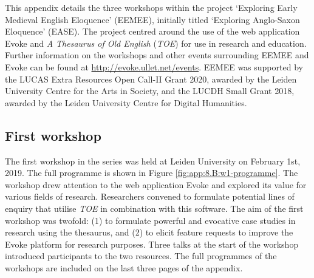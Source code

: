 This appendix details the three workshops within the project `Exploring Early Medieval English Eloquence' (EEMEE), initially titled `Exploring Anglo-Saxon Eloquence' (EASE). The project centred around the use of the web application Evoke and \textit{A Thesaurus of Old English} (\textit{TOE}) for use in research and education. 
Further information on the workshops and other events surrounding EEMEE and Evoke can be found at \url{http://evoke.ullet.net/events}. EEMEE was supported by the LUCAS Extra Resources Open Call-II Grant 2020, awarded by the Leiden University Centre for the Arts in Society, and the LUCDH Small Grant 2018, awarded by the Leiden University Centre for Digital Humanities.




\subsection{First workshop}

The first workshop in the series was held at Leiden University on February 1st, 2019. The full programme is shown in Figure \ref{fig:app:8.B:w1-programme}. The workshop drew attention to the web application Evoke and explored its value for various fields of research. Researchers convened to formulate potential lines of enquiry that utilise \textit{TOE} in combination with this software. The aim of the first workshop was twofold: (1) to formulate powerful and evocative case studies in research using the thesaurus, and (2) to elicit feature requests to improve the Evoke platform for research purposes. Three talks at the start of the workshop introduced participants to the two resources. 
The full programmes of the workshops are included on the last three pages of the appendix. 

